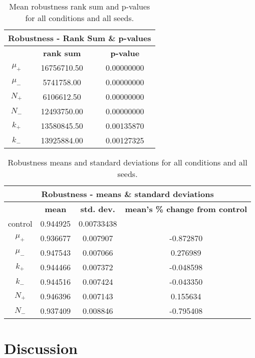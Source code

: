 \begin{table}
	\begin{tabular}{|c|c|c|}
		\hline
		\multicolumn{3}{c}{\Large \textbf{Robustness - Rank Sum \& p-values}} \\
		\hline
		& \textbf{rank sum} & \textbf{p-value} \\
		\hline
		$\mu_+$ & 16756710.50 & 0.00000000 \\ 
		\hline
		$\mu_-$ & 5741758.00 & 0.00000000 \\ 
		\hline
		$N_+$ & 6106612.50 & 0.00000000 \\ 
		\hline
		$N_-$ & 12493750.00 & 0.00000000 \\ 
		\hline
		$k_+$ & 13580845.50 & 0.00135870 \\ 
		\hline
		$k_-$ & 13925884.00 & 0.00127325 \\ 
		\hline
	\end{tabular}
	\caption[Robustness rank sum \& p-values]{Mean robustness rank sum and p-values for all conditions and all seeds.}
	\label{table:rank_sum_p-values}
\end{table}
\begin{table}[H]
	\begin{tabular}{|c|c|c|c|}
		\hline
		\multicolumn{4}{c}{\Large \textbf{Robustness - means \& standard deviations}} \\
		\hline
		& \textbf{mean} & \textbf{std. dev.} & \textbf{mean's \% change from control} \\
		\hline
		control & 0.944925 & 0.00733438 & \textemdash \\ 
		\hline
		$\mu_+$ & 0.936677 & 0.007907 & -0.872870 \\ 
		\hline
		$\mu_-$ & 0.947543 & 0.007066 & 0.276989 \\ 
		\hline
		$k_+$ & 0.944466 & 0.007372 & -0.048598 \\ 
		\hline
		$k_-$ & 0.944516 & 0.007424 & -0.043350 \\ 
		\hline
		$N_+$ & 0.946396 & 0.007143 & 0.155634 \\ 
		\hline
		$N_-$ & 0.937409 & 0.008846 & -0.795408 \\ 
		\hline
	\end{tabular}
	\caption[Robustness means and standard deviations]{Robustness means and standard deviations for all conditions and all seeds.}
	\label{table:robustness_means_and_std_dev}
\end{table}


\section{Discussion}\label{discussion}

